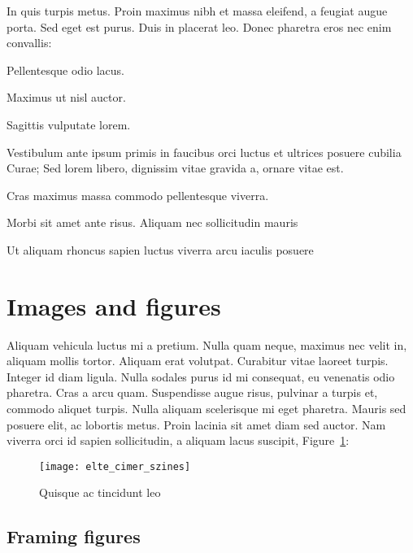 \bigskip

In quis turpis metus. Proin maximus nibh et massa eleifend, a feugiat augue porta. Sed eget est purus. Duis in placerat leo. Donec pharetra eros nec enim convallis:
\begin{compactitem}
	\item Pellentesque odio lacus.
	\item Maximus ut nisl auctor.
	\item Sagittis vulputate lorem.
\end{compactitem}

\bigskip

Vestibulum ante ipsum primis in faucibus orci luctus et ultrices posuere cubilia Curae; Sed lorem libero, dignissim vitae gravida a, ornare vitae est.
\begin{compactdesc}
	\item[Cras maximus] massa commodo pellentesque viverra.
	\item[Morbi sit] amet ante risus. Aliquam nec sollicitudin mauris
	\item[Ut aliquam rhoncus sapien] luctus viverra arcu iaculis posuere
\end{compactdesc}


\section{Images and figures}

Aliquam vehicula luctus mi a pretium. Nulla quam neque, maximus nec velit in, aliquam mollis tortor. Aliquam erat volutpat. Curabitur vitae laoreet turpis. Integer id diam ligula. Nulla sodales purus id mi consequat, eu venenatis odio pharetra. Cras a arcu quam. Suspendisse augue risus, pulvinar a turpis et, commodo aliquet turpis. Nulla aliquam scelerisque mi eget pharetra. Mauris sed posuere elit, ac lobortis metus. Proin lacinia sit amet diam sed auctor. Nam viverra orci id sapien sollicitudin, a aliquam lacus suscipit, Figure~\ref{fig:example-1}:

\begin{figure}[H]
	\centering
	\texttt{[image: elte\_cimer\_szines]}
	\caption{Quisque ac tincidunt leo}
	\label{fig:example-1}
\end{figure}

\subsection{Framing figures}

